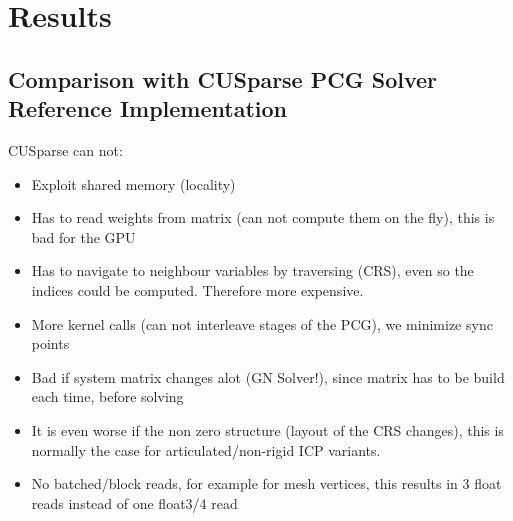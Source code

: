 \section{Results}
\label{sec:results}

\subsection{Comparison with CUSparse PCG Solver Reference Implementation}

CUSparse can not:
\begin{itemize}
\item Exploit shared memory (locality)
\item Has to read weights from matrix (can not compute them on the fly), this is bad for the GPU
\item Has to navigate to neighbour variables by traversing (CRS), even so the indices could be computed. Therefore more expensive.
\item More kernel calls (can not interleave stages of the PCG), we minimize sync points
\item Bad if system matrix changes alot (GN Solver!), since matrix has to be build each time, before solving
\item It is even worse if the non zero structure (layout of the CRS changes), this is normally the case for articulated/non-rigid ICP variants.
\item No batched/block reads, for example for mesh vertices, this results in 3 float reads instead of one float3/4 read
\end{itemize}
